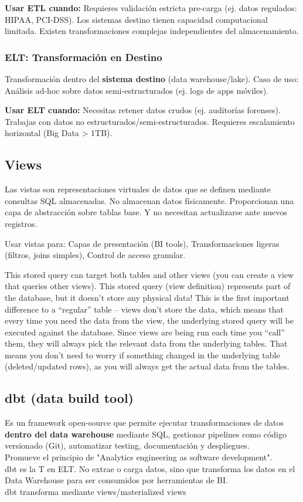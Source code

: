 \documentclass[12pt]{book}
\begin{document}
\textbf{Usar ETL cuando:} Requieres validación estricta pre-carga (ej. datos regulados: HIPAA, PCI-DSS). 
Los sistemas destino tienen capacidad computacional limitada. Existen transformaciones complejas independientes 
del almacenamiento.

\subsubsection{ELT: Transformación en Destino}
Transformación dentro del \textbf{sistema destino} (data warehouse/lake). Caso de uso: Análisis 
ad-hoc sobre datos semi-estructurados (ej. logs de apps móviles).

\textbf{Usar ELT cuando:} 
Necesitas retener datos crudos (ej. auditorías forenses). Trabajas con datos no 
estructurados/semi-estructurados. Requieres escalamiento horizontal (Big Data > 1TB).

\subsection{Views}
Las vistas son representaciones virtuales de datos que se  definen mediante consultas 
SQL almacenadas. No almacenan datos físicamente. Proporcionan una capa de abstracción 
sobre tablas base. Y no necesitan actualizarse ante nuevos registros.

Usar vistas para: Capas de presentación (BI tools), Transformaciones ligeras (filtros, 
joins simples), Control de acceso granular. 

This stored query can target both tables and other views (you can create a view that queries other views). This stored query (view definition) represents part of the database, but it doesn't store any physical data! This is the first important difference to a “regular” table – views don't store the data, which means that every time you need the data from the view, the underlying stored query will be executed against the database. Since views are being run each time you “call” them, they will always pick the relevant data from the underlying tables. That means you don't need to worry if something changed in the underlying table (deleted/updated rows), as you will always get the actual data from the tables.

\subsection{dbt (data build tool)}
Es un framework open-source que permite ejecutar transformaciones de datos \textbf{dentro 
del data warehouse} mediante SQL, gestionar pipelines como código versionado (Git), automatizar 
testing, documentación y despliegues.\\
Promueve el principio de "Analytics engineering as software development".\\
dbt es la T en ELT. No extrae o carga datos, sino que transforma los datos en el Data Warehouse 
para ser consumidos por herramientas de BI.\\
dbt transforma mediante views/materialized views\\
\end{document}
